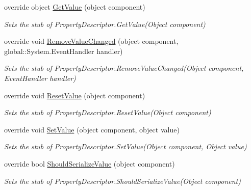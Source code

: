 \begin{DoxyCompactItemize}
override object \hyperlink{class_system_1_1_component_model_1_1_fakes_1_1_stub_property_descriptor_a84fb14351358bb1158c329c5fb7fbc6b}{Get\-Value} (object component)
\begin{DoxyCompactList}\small\item\em Sets the stub of Property\-Descriptor.\-Get\-Value(\-Object component)\end{DoxyCompactList}\item 
override void \hyperlink{class_system_1_1_component_model_1_1_fakes_1_1_stub_property_descriptor_a95c249eb4fdde2503fd05d342a2750f5}{Remove\-Value\-Changed} (object component, global\-::\-System.\-Event\-Handler handler)
\begin{DoxyCompactList}\small\item\em Sets the stub of Property\-Descriptor.\-Remove\-Value\-Changed(\-Object component, Event\-Handler handler)\end{DoxyCompactList}\item 
override void \hyperlink{class_system_1_1_component_model_1_1_fakes_1_1_stub_property_descriptor_ad6f6eed8a2601cff806f51841d6cfcbb}{Reset\-Value} (object component)
\begin{DoxyCompactList}\small\item\em Sets the stub of Property\-Descriptor.\-Reset\-Value(\-Object component)\end{DoxyCompactList}\item 
override void \hyperlink{class_system_1_1_component_model_1_1_fakes_1_1_stub_property_descriptor_a10d491ddc20311db6dd7d9189bd03dad}{Set\-Value} (object component, object value)
\begin{DoxyCompactList}\small\item\em Sets the stub of Property\-Descriptor.\-Set\-Value(\-Object component, Object value)\end{DoxyCompactList}\item 
override bool \hyperlink{class_system_1_1_component_model_1_1_fakes_1_1_stub_property_descriptor_ae4c1148975bbf401b732e8d8114dcbfc}{Should\-Serialize\-Value} (object component)
\begin{DoxyCompactList}\small\item\em Sets the stub of Property\-Descriptor.\-Should\-Serialize\-Value(\-Object component)\end{DoxyCompactList}\end{DoxyCompactItemize}
